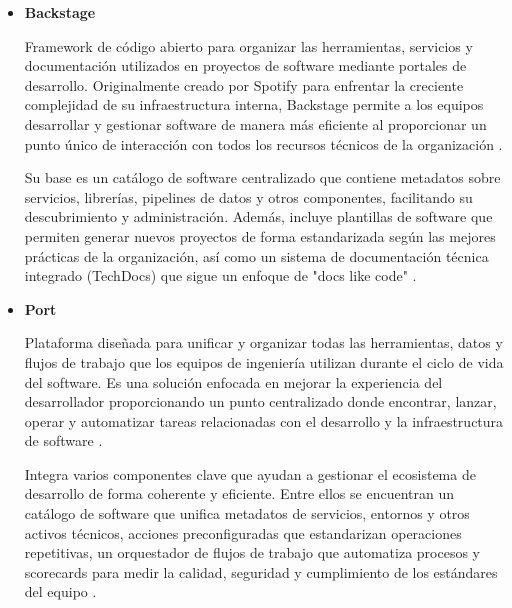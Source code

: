\begin{itemize}

    \item \textbf{Backstage}  
    
    Framework de código abierto para organizar las herramientas, servicios y documentación utilizados en proyectos de software mediante portales de desarrollo. Originalmente creado por Spotify para enfrentar la creciente complejidad de su infraestructura interna, Backstage permite a los equipos desarrollar y gestionar software de manera más eficiente al proporcionar un punto único de interacción con todos los recursos técnicos de la organización \citep{backstage-2026}.

    Su base es un catálogo de software centralizado que contiene metadatos sobre servicios, librerías, pipelines de datos y otros componentes, facilitando su descubrimiento y administración. Además, incluye plantillas de software que permiten generar nuevos proyectos de forma estandarizada según las mejores prácticas de la organización, así como un sistema de documentación técnica integrado (TechDocs) que sigue un enfoque de "docs like code" \citep{backstage-2026}.

    \item \textbf{Port}  
    
    Plataforma diseñada para unificar y organizar todas las herramientas, datos y flujos de trabajo que los equipos de ingeniería utilizan durante el ciclo de vida del software. Es una solución enfocada en mejorar la experiencia del desarrollador proporcionando un punto centralizado donde encontrar, lanzar, operar y automatizar tareas relacionadas con el desarrollo y la infraestructura de software \citep{port-platform-2026}.

    Integra varios componentes clave que ayudan a gestionar el ecosistema de desarrollo de forma coherente y eficiente. Entre ellos se encuentran un catálogo de software que unifica metadatos de servicios, entornos y otros activos técnicos, acciones preconfiguradas que estandarizan operaciones repetitivas, un orquestador de flujos de trabajo que automatiza procesos y scorecards para medir la calidad, seguridad y cumplimiento de los estándares del equipo \citep{port-platform-2026}.
    
\end{itemize}
